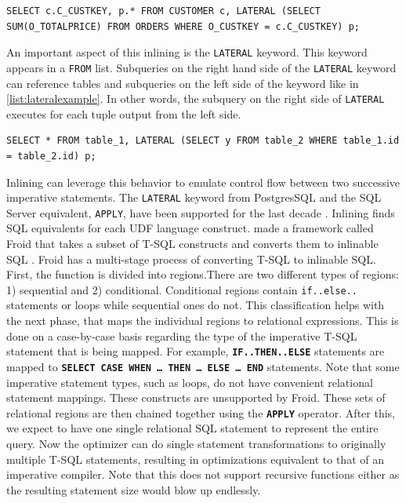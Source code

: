 \documentclass[12pt]{cmuthesis}
\newcommand{\dbSQL}[1]{\texttt{\textbf{#1}}\xspace}
\begin{document}
\begin{listing}
    \begin{verbatim}
SELECT c.C_CUSTKEY, p.* FROM CUSTOMER c, LATERAL (SELECT SUM(O_TOTALPRICE) FROM ORDERS WHERE O_CUSTKEY = c.C_CUSTKEY) p;
    \end{verbatim}
    \caption{Optimized equivalent of \cref{list:blackexample}}
    \label{list:blackexamplegood}
    \end{listing}

An important aspect of this inlining is the \texttt{LATERAL} keyword. This keyword appears in a \texttt{FROM} list. Subqueries on the right hand side of the \texttt{LATERAL} keyword can reference tables and subqueries on the left side of the keyword like in \cref{list:lateralexample}. In other words, the subquery on the right side of \texttt{LATERAL} executes for each tuple output from the left side.
\begin{listing}
    \begin{verbatim}
SELECT * FROM table_1, LATERAL (SELECT y FROM table_2 WHERE table_1.id = table_2.id) p;
    \end{verbatim}
    \caption{An example usage of \texttt{LATERAL}. The subquery on the right hand side of \texttt{LATERAL} can freely reference \texttt{FROM} entries to the left ot the keyword.}
    \label{list:lateralexample}
    \end{listing}


Inlining can leverage this behavior to emulate control flow between two successive imperative statements. The \texttt{LATERAL} keyword from PostgresSQL and the SQL Server equivalent, \texttt{APPLY}, have been supported for the last decade \cite{galindo01, pgsqllateral}. Inlining finds SQL equivalents for each UDF language construct. \citeauthor{ramachandra19} made a framework called Froid that takes a subset of T-SQL constructs and converts them to inlinable SQL \cite{ramachandra19}. Froid has a multi-stage process of converting T-SQL to inlinable SQL. First, the function is divided into regions.There are two different types of regions: 1) sequential and 2) conditional. Conditional regions contain \texttt{if..else..} statements or loops while sequential ones do not. This classification helps with the next phase, that maps the individual regions to relational expressions. This is done on a case-by-case basis regarding the type of the imperative T-SQL statement that is being mapped. For example, \dbSQL{IF..THEN..ELSE} statements are mapped to \dbSQL{SELECT CASE WHEN … THEN … ELSE … END} statements. Note that some imperative statement types, such as loops, do not have convenient relational statement mappings. These constructs are unsupported by Froid. These sets of relational regions are then chained together using the \dbSQL{APPLY} operator. After this, we expect to have one single relational SQL statement to represent the entire query. Now the optimizer can do single statement transformations to originally multiple T-SQL statements, resulting in optimizations equivalent to that of an imperative compiler. Note that this does not support recursive functions either as the resulting statement size would blow up endlessly.\\
\end{document}
